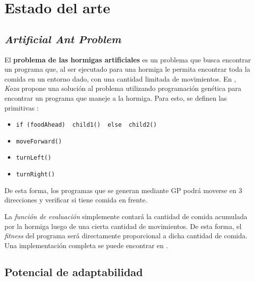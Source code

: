 \section{Estado del arte}
  \subsection{\textit{Artificial Ant Problem}}
    El \textbf{problema de las hormigas artificiales} \autocite{kozaGeneticProgrammingMeans1994} es 
    un problema que busca encontrar un programa que, al ser ejecutado para una hormiga le permita 
    encontrar toda la comida en un entorno dado, con una cantidad limitada de movimientos.
    En \autocite{kozaGeneticProgrammingMeans1994}, \textit{Koza} propone una solución al problema
    utilizando programación genética para encontrar un programa que maneje a la hormiga.
    Para esto, se definen las primitivas \cite{deapprojectArtificialAntProblem}:
    
    \begin{itemize}
      \item \texttt{if (foodAhead) { child1() } else { child2() }}
      \item \texttt{moveForward()}
      \item \texttt{turnLeft()}
      \item \texttt{turnRight()}
    \end{itemize}

    De esta forma, los programas que se generan mediante GP podrá moverse en 3 direcciones y 
    verificar si tiene comida en frente.

    La \textit{función de evaluación} simplemente contará la cantidad de comida acumulada por la 
    hormiga luego de una cierta cantidad de movimientos.
    De esta forma, el \textit{fitness} del programa será directamente proporcional a dicha cantidad
    de comida.
    Una implementación completa se puede encontrar en \cite{fortinDeapAntPy2022}.
  
  \subsection{Potencial de adaptabilidad}
    